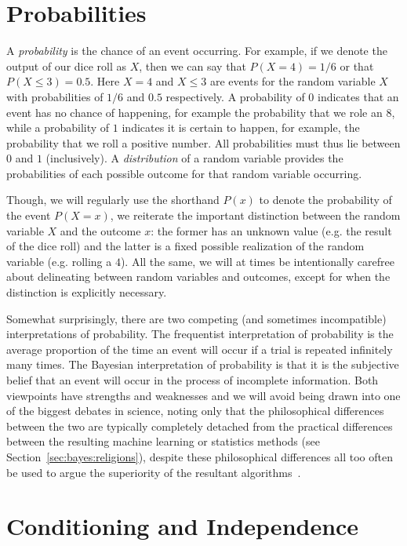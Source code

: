 \section{Probabilities}
\label{sec:prob:prob}

A \emph{probability} is
the chance of an event occurring.  For example, if we denote the output
of our dice roll as $X$, then we can say that $P(X=4) = 1/6$ or that $P(X\le3) = 0.5$.  Here
$X=4$ and $X\le3$ are events for the random variable $X$ with probabilities of $1/6$ and $0.5$
respectively.   A probability of $0$ indicates that an event has no chance of happening, 
for example the probability that we role an $8$, while
a probability of $1$ indicates it is certain to happen, for example, the probability 
that we roll a positive number.  All probabilities must thus lie between $0$ and $1$ 
(inclusively).  
A \emph{distribution} of a random variable provides the probabilities of each possible 
outcome for that random variable occurring.

Though, we will regularly use the shorthand $P(x)$ to denote the probability of the 
event $P(X=x)$,
we reiterate the important distinction between the random variable $X$ and the outcome $x$:
the former has an unknown value (e.g. the result of the dice roll) and the latter is
a fixed possible realization of the random variable (e.g. rolling a $4$).
All the same, we will at times be intentionally carefree about delineating between
random variables and outcomes, except for when the distinction is explicitly necessary.

Somewhat surprisingly, there are two competing (and sometimes incompatible)
interpretations of probability.  The frequentist interpretation of
probability is the average proportion of the time an event will occur if a trial is 
repeated infinitely many times.  The Bayesian interpretation of probability is that it is the subjective
belief that an event will occur in the process of incomplete information.  Both viewpoints have
strengths and weaknesses and we will avoid being drawn into one of the biggest debates in
science, noting only that the philosophical differences between the two are typically completely
detached from the practical differences between the resulting machine learning or statistics
methods (see Section~\ref{sec:bayes:religions}), despite these philosophical differences all too 
often be used to argue the superiority of the resultant algorithms~\citep{gelman2011induction,steinhardt2012beyond}.

\section{Conditioning and Independence}
\label{sec:prob:cond}

